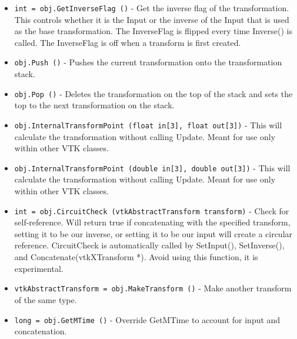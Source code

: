 \begin{itemize}
\item  \verb|int = obj.GetInverseFlag ()| -  Get the inverse flag of the transformation.  This controls
 whether it is the Input or the inverse of the Input that
 is used as the base transformation.  The InverseFlag is
 flipped every time Inverse() is called.  The InverseFlag
 is off when a transform is first created.

\item  \verb|obj.Push ()| -  Pushes the current transformation onto the transformation stack.

\item  \verb|obj.Pop ()| -  Deletes the transformation on the top of the stack and sets the top 
 to the next transformation on the stack.

\item  \verb|obj.InternalTransformPoint (float in[3], float out[3])| -  This will calculate the transformation without calling Update.
 Meant for use only within other VTK classes.

\item  \verb|obj.InternalTransformPoint (double in[3], double out[3])| -  This will calculate the transformation without calling Update.
 Meant for use only within other VTK classes.

\item  \verb|int = obj.CircuitCheck (vtkAbstractTransform transform)| -  Check for self-reference.  Will return true if concatenating
 with the specified transform, setting it to be our inverse,
 or setting it to be our input will create a circular reference.
 CircuitCheck is automatically called by SetInput(), SetInverse(),
 and Concatenate(vtkXTransform *).  Avoid using this function,
 it is experimental.

\item  \verb|vtkAbstractTransform = obj.MakeTransform ()| -  Make another transform of the same type.

\item  \verb|long = obj.GetMTime ()| -  Override GetMTime to account for input and concatenation.

\end{itemize}
